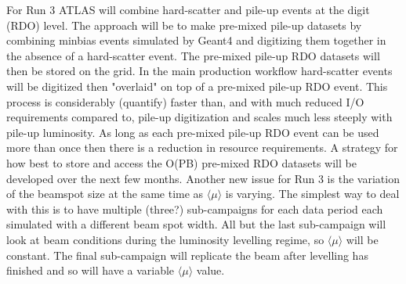 For Run 3 ATLAS will combine hard-scatter and pile-up events at the digit (RDO) level.  The approach will be to make pre-mixed pile-up datasets by combining minbias events simulated by Geant4 and digitizing them together in the absence of a hard-scatter event. The pre-mixed pile-up RDO datasets will then be stored on the grid.  In the main production workflow hard-scatter events will be digitized then "overlaid" on top of a pre-mixed pile-up RDO event.  This process is considerably (quantify) faster than, and with much reduced I/O requirements compared to, pile-up digitization and scales much less steeply with pile-up luminosity.  As long as each pre-mixed pile-up RDO event can be used more than once then there is a reduction in resource requirements.  A strategy for how best to store and access the O(PB) pre-mixed RDO datasets will be developed over the next few months.  Another new issue for Run 3 is the variation of the beamspot size at the same time as $\langle\mu\rangle$ is varying.  The simplest way to deal with this is to have multiple (three?) sub-campaigns for each data period each simulated with a different beam spot width.  All but the last sub-campaign will look at beam conditions during the luminosity levelling regime, so $\langle\mu\rangle$ will be constant. The final sub-campaign will replicate the beam after levelling has finished and so will have a variable $\langle\mu\rangle$ value.
